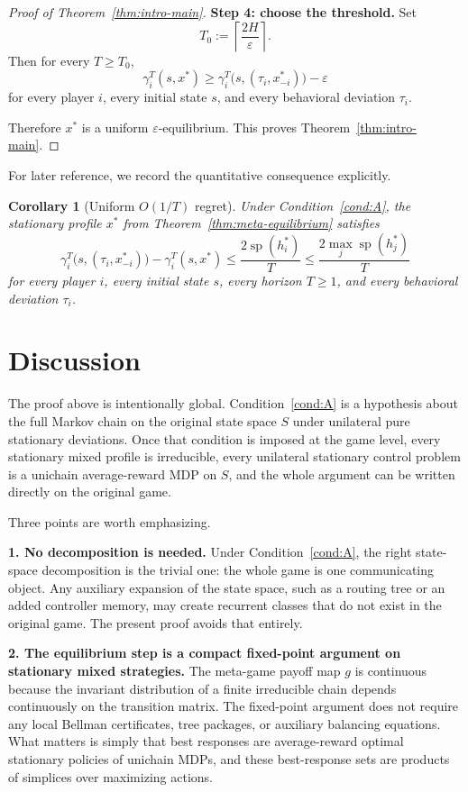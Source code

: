 \documentclass[11pt]{article}
\newtheorem{corollary}[theorem]{Corollary}
\theoremstyle{definition}
\newcommand{\1}{\mathbf{1}}
\DeclareMathOperator{\spn}{sp}
\begin{document}
\begin{proof}[Proof of Theorem~\ref{thm:intro-main}]
\smallskip
\noindent
\textbf{Step 4: choose the threshold.}
Set
\[
T_0:=\left\lceil \frac{2H}{\varepsilon}\right\rceil.
\]
Then for every $T\ge T_0$,
\[
\gamma_i^T(s,x^*)\ge \gamma_i^T\bigl(s,(\tau_i,x_{-i}^*)\bigr)-\varepsilon
\]
for every player $i$, every initial state $s$, and every behavioral deviation $\tau_i$.

Therefore $x^*$ is a uniform $\varepsilon$-equilibrium. This proves Theorem~\ref{thm:intro-main}.
\end{proof}

For later reference, we record the quantitative consequence explicitly.

\begin{corollary}[Uniform $O(1/T)$ regret]\label{cor:o1overT}
Under Condition~\ref{cond:A}, the stationary profile $x^*$ from Theorem~\ref{thm:meta-equilibrium} satisfies
\[
\gamma_i^T\bigl(s,(\tau_i,x_{-i}^*)\bigr)-\gamma_i^T(s,x^*)
\le \frac{2\spn(h_i^*)}{T}
\le \frac{2\max_j\spn(h_j^*)}{T}
\]
for every player $i$, every initial state $s$, every horizon $T\ge1$, and every behavioral deviation $\tau_i$.
\end{corollary}

\section{Discussion}\label{sec:discussion}

The proof above is intentionally global. Condition~\ref{cond:A} is a hypothesis about the full Markov chain on the original state space $S$ under unilateral pure stationary deviations. Once that condition is imposed at the game level, every stationary mixed profile is irreducible, every unilateral stationary control problem is a unichain average-reward MDP on $S$, and the whole argument can be written directly on the original game.

Three points are worth emphasizing.

\medskip
\noindent
\textbf{1. No decomposition is needed.}
Under Condition~\ref{cond:A}, the right state-space decomposition is the trivial one: the whole game is one communicating object. Any auxiliary expansion of the state space, such as a routing tree or an added controller memory, may create recurrent classes that do not exist in the original game. The present proof avoids that entirely.

\medskip
\noindent
\textbf{2. The equilibrium step is a compact fixed-point argument on stationary mixed strategies.}
The meta-game payoff map $g$ is continuous because the invariant distribution of a finite irreducible chain depends continuously on the transition matrix. The fixed-point argument does not require any local Bellman certificates, tree packages, or auxiliary balancing equations. What matters is simply that best responses are average-reward optimal stationary policies of unichain MDPs, and these best-response sets are products of simplices over maximizing actions.
\end{document}
